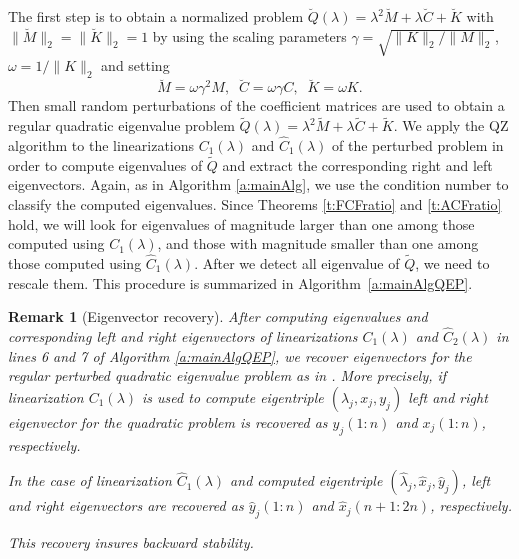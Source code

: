 \documentclass[12pt]{article}
\newtheorem{remark}[theorem]{Remark}
\begin{document}
The first step is to obtain a normalized problem $\breve{Q}(\lambda) = \lambda^2\breve{M} + \lambda\breve{C} + \breve{K}$ with $\|\breve{M}\|_2 = \|\breve{K}\|_2=1$ by using the scaling parameters 
 $\gamma = \sqrt{\|K\|_2 / \|M\|_2}$, $\omega = 1/\|K\|_2$
 and setting
 \[
     \breve{M} = \omega\gamma^2M, \;\; \breve{C} = \omega\gamma C, \;\; \breve{K} = \omega K.
 \]
  Then small random perturbations of the coefficient matrices are used to obtain a regular quadratic eigenvalue problem $\tilde{Q}(\lambda) = \lambda^2\tilde{M}+\lambda \tilde{C} + \tilde{K}$. We apply the QZ algorithm to the linearizations $C_1(\lambda)$ and $\hat{C}_1(\lambda)$ of the perturbed problem  in order to compute eigenvalues of $\tilde Q$ and extract the corresponding right and left eigenvectors. Again, as in Algorithm \ref{a:mainAlg}, we use the condition number to classify the computed eigenvalues.
Since Theorems \ref{t:FCFratio} and \ref{t:ACFratio} hold, we will look for eigenvalues of magnitude larger than one among those computed using $C_1(\lambda)$, and those with magnitude smaller than one among those computed using $\hat{C}_1(\lambda)$. After we detect all eigenvalue of $\tilde Q$, we need to rescale them. This procedure is summarized in Algorithm~\ref{a:mainAlgQEP}.
\begin{remark}[Eigenvector recovery]
    After computing eigenvalues and corresponding left and right eigenvectors of linearizations $C_1(\lambda)$ and $\hat{C}_2(\lambda)$ in lines 6 and 7 of Algorithm \ref{a:mainAlgQEP}, we recover eigenvectors for the regular perturbed quadratic eigenvalue problem as in \cite{zeng2014backward}. More precisely, if linearization $C_1(\lambda)$ is used to compute eigentriple $(\lambda_j,x_j,y_j)$ left and right eigenvector for the quadratic problem is recovered as $y_j(1:n)$ and $x_j(1:n)$, respectively.
    
    In the case of linearization $\hat{C}_1(\lambda)$ and computed eigentriple $(\hat{\lambda}_j,\hat{x}_j,\hat{y}_j)$, left and right eigenvectors are recovered as $\hat{y}_j(1:n)$ and $\hat{x}_j(n+1:2n)$, respectively. 
    
    This recovery insures backward stability.
\end{remark}
\end{document}
